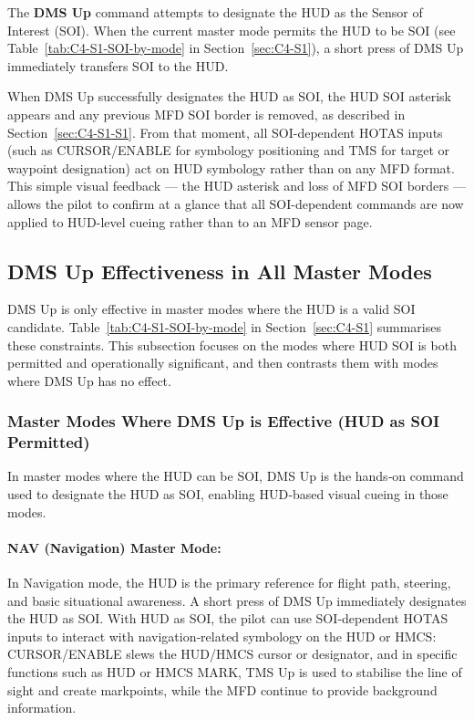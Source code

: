 \documentclass[11pt, a4paper, twoside]{report}
\begin{document}
The \textbf{DMS Up} command attempts to designate the HUD as the Sensor of Interest (SOI). When the current master mode permits the HUD to be SOI (see Table~\ref{tab:C4-S1-SOI-by-mode} in Section~\ref{sec:C4-S1}), a short press of DMS Up immediately transfers SOI to the HUD.

When DMS Up successfully designates the HUD as SOI, the HUD SOI asterisk appears and any previous MFD SOI border is removed, as described in Section~\ref{sec:C4-S1-S1}. From that moment, all SOI-dependent HOTAS inputs (such as CURSOR/ENABLE for symbology positioning and TMS for target or waypoint designation) act on HUD symbology rather than on any MFD format. This simple visual feedback --- the HUD asterisk and loss of MFD SOI borders --- allows the pilot to confirm at a glance that all SOI-dependent commands are now applied to HUD-level cueing rather than to an MFD sensor page.

\subsection{DMS Up Effectiveness in All Master Modes}
\label{sec:C4-S2-S1}

DMS Up is only effective in master modes where the HUD is a valid SOI candidate. Table~\ref{tab:C4-S1-SOI-by-mode} in Section~\ref{sec:C4-S1} summarises these constraints. This subsection focuses on the modes where HUD SOI is both permitted and operationally significant, and then contrasts them with modes where DMS Up has no effect.

\subsubsection{Master Modes Where DMS Up is Effective (HUD as SOI Permitted)}
\label{sec:C4-S2-S1-S1}

In master modes where the HUD can be SOI, DMS Up is the hands‑on command used to designate the HUD as SOI, enabling HUD‑based visual cueing in those modes.

\paragraph*{NAV (Navigation) Master Mode:}
In Navigation mode, the HUD is the primary reference for flight path, steering, and basic situational awareness. A short press of DMS Up immediately designates the HUD as SOI. With HUD as SOI, the pilot can use SOI‑dependent HOTAS inputs to interact with navigation‑related symbology on the HUD or HMCS: CURSOR/ENABLE slews the HUD/HMCS cursor or designator, and in specific functions such as HUD or HMCS MARK, TMS Up is used to stabilise the line of sight and create markpoints, while the MFD continue to provide background information.
\end{document}
